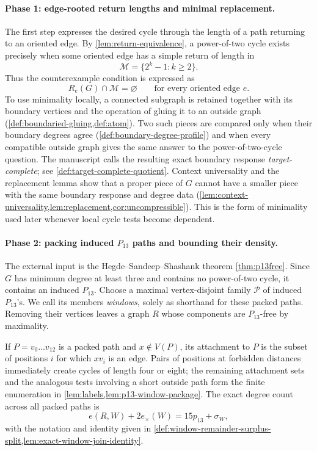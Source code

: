 \documentclass[11pt]{article}
\newcommand{\Mers}{\mathcal M}
\begin{document}
\paragraph{Phase 1: edge-rooted return lengths and minimal replacement.}
The first step expresses the desired cycle through the length of a path
returning to an oriented edge.  By
\cref{lem:return-equivalence}, a power-of-two cycle exists precisely when some
oriented edge has a simple return of length in
\[
\Mers=\{2^k-1:k\ge2\}.
\]
Thus the counterexample condition is expressed as
\[
R_e(G)\cap \Mers=\varnothing
\qquad\text{for every oriented edge }e .
\]
To use minimality locally, a connected subgraph is retained together with its
boundary vertices and the operation of gluing it to an outside graph
(\cref{def:boundaried-gluing,def:atom}).  Two such pieces are compared only
when their boundary degrees agree (\cref{def:boundary-degree-profile}) and
when every compatible outside graph gives the same answer to the
power-of-two-cycle question.  The manuscript calls the resulting exact
boundary response \emph{target-complete}; see
\cref{def:target-complete-quotient}.  Context universality and the replacement
lemma show that a proper piece of $G$ cannot have a smaller piece with the
same boundary response and degree data
(\cref{lem:context-universality,lem:replacement,cor:uncompressible}).  This is
the form of minimality used later whenever local cycle tests become dependent.

\paragraph{Phase 2: packing induced $P_{13}$ paths and bounding their density.}
The external input is the Hegde--Sandeep--Shashank theorem
\cref{thm:p13free}.  Since $G$ has minimum degree at least three and contains
no power-of-two cycle, it contains an induced $P_{13}$.  Choose a maximal
vertex-disjoint family $\mathcal P$ of induced $P_{13}$'s.  We call its
members \emph{windows}, solely as shorthand for these packed paths.  Removing
their vertices leaves a graph $R$ whose components are $P_{13}$-free by
maximality.

If $P=v_0\ldots v_{12}$ is a packed path and $x\notin V(P)$, its attachment
to $P$ is the subset of positions $i$ for which $xv_i$ is an edge.  Pairs of
positions at forbidden distances immediately create cycles of length four or
eight; the remaining attachment sets and the analogous tests involving a
short outside path form the finite enumeration in
\cref{lem:labels,lem:p13-window-package}.  The exact degree count across all
packed paths is
\[
e(R,W)+2e_\times(W)=15p_{13}+\sigma_W,
\]
with the notation and identity given in
\cref{def:window-remainder-surplus-split,lem:exact-window-join-identity}.
\end{document}
